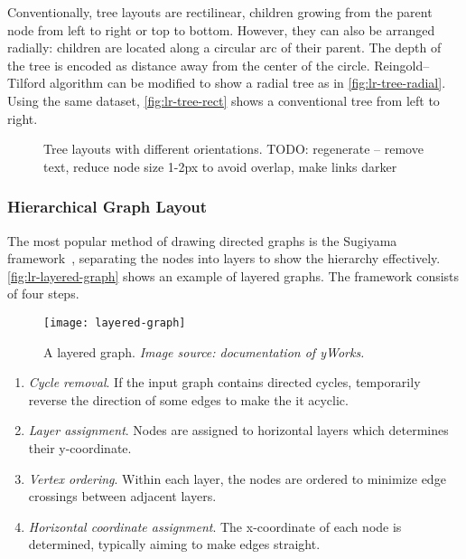 Conventionally, tree layouts are rectilinear, children growing from the parent node from left to right or top to bottom. However, they can also be arranged radially: children are located along a circular arc of their parent. The depth of the tree is encoded as distance away from the center of the circle. Reingold--Tilford algorithm can be modified to show a radial tree as in \autoref{fig:lr-tree-radial}. Using the same dataset, \autoref{fig:lr-tree-rect} shows a conventional tree from left to right.

\begin{figure}[!htb]
\centering
{}
\hfill
{}
\caption{Tree layouts with different orientations. TODO: regenerate -- remove text, reduce node size 1-2px to avoid overlap, make links darker}
\end{figure}
  
\subsubsection{Hierarchical Graph Layout}	
The most popular method of drawing directed graphs is the Sugiyama framework~\cite{Sugiyama1981}, separating the nodes into layers to show the hierarchy effectively. \autoref{fig:lr-layered-graph} shows an example of layered graphs. The framework consists of four steps.

\begin{figure}[!htb]
	\centering
	\texttt{[image: layered-graph]}
	\caption{A layered graph. \textrm{\emph{Image source: documentation of yWorks.}}}
	\label{fig:lr-layered-graph}
\end{figure}

\begin{enumerate}
	\item \emph{Cycle removal}. If the input graph contains directed cycles, temporarily reverse the direction of some edges to make the it acyclic.
	\item \emph{Layer assignment}. Nodes are assigned to horizontal layers which determines their y-coordinate.
	\item \emph{Vertex ordering}. Within each layer, the nodes are ordered to minimize edge crossings between adjacent layers.
	\item \emph{Horizontal coordinate assignment}. The x-coordinate of each node is determined, typically aiming to make edges straight.
\end{enumerate}


